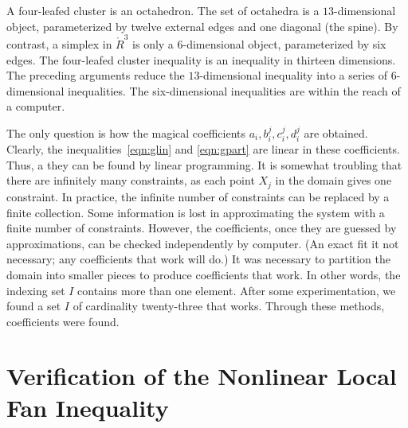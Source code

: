A four-leafed cluster is an octahedron.  The set of octahedra is a
$13$-dimensional object, parameterized by twelve external edges and one
diagonal (the spine).  By contrast, a simplex in $\ring{R}^3$ is only
a $6$-dimensional object, parameterized by six edges.  The four-leafed
cluster inequality is an inequality in thirteen dimensions.  The preceding
arguments reduce the $13$-dimensional inequality into a series of
$6$-dimensional inequalities.  The six-dimensional inequalities are
within the reach of a computer.

The only question is how the magical coefficients
$a_i,b_i^j,c_i^j,d_i^j$ are obtained.  Clearly, the
inequalities~\eqref{eqn:glin} and \eqref{eqn:gpart} are linear in these
coefficients.  Thus, a they can be found by linear programming.  It is
somewhat troubling that there are infinitely many constraints, as each
point $X_j$ in the domain gives one constraint.  In practice, the
infinite number of constraints can be replaced by a finite collection.
Some information is lost in approximating the system with a finite
number of constraints.  However, the coefficients, once they are
guessed by approximations, can be checked independently by computer.
(An exact fit it not necessary; any coefficients that work will do.)
It was necessary to partition the domain into smaller pieces to
produce coefficients that work.  In other words, the indexing set $I$
contains more than one element.  After some experimentation, we found
a set $I$ of cardinality twenty-three that works.  Through these methods,
coefficients were found.






\section{Verification of the Nonlinear Local Fan Inequality}



